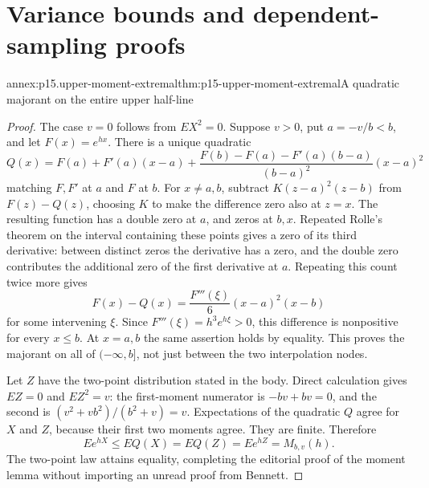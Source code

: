 \section{Variance bounds and dependent-sampling proofs}
\label{sec:annex-p15-variance-dependent-concentration}

\begin{annexitem}{annex:p15.upper-moment-extremal}{thm:p15-upper-moment-extremal}{A quadratic majorant on the entire upper half-line}
\begin{proof}
The case \(v=0\) follows from \(EX^2=0\). Suppose \(v>0\), put
\(a=-v/b<b\), and let \(F(x)=e^{hx}\). There is a unique quadratic
\[
 Q(x)=F(a)+F'(a)(x-a)
 +\frac{F(b)-F(a)-F'(a)(b-a)}{(b-a)^2}(x-a)^2
\]
matching \(F,F'\) at \(a\) and \(F\) at \(b\).
For \(x\ne a,b\), subtract
\(K(z-a)^2(z-b)\) from \(F(z)-Q(z)\), choosing \(K\) to make the
difference zero also at \(z=x\). The resulting function has a double
zero at \(a\), and zeros at \(b,x\).
Repeated Rolle's theorem on the interval containing these points gives
a zero of its third derivative: between distinct zeros the derivative
has a zero, and the double zero contributes the additional zero of the
first derivative at \(a\). Repeating this count twice more gives
\[
 F(x)-Q(x)=\frac{F'''(\xi)}6(x-a)^2(x-b)
\]
for some intervening \(\xi\). Since \(F'''(\xi)=h^3e^{h\xi}>0\),
this difference is nonpositive for every \(x\leq b\).
At \(x=a,b\) the same assertion holds by equality.
This proves the majorant on all of \((-\infty,b]\), not just between
the two interpolation nodes.

Let \(Z\) have the two-point distribution stated in the body.
Direct calculation gives \(EZ=0\) and \(EZ^2=v\):
the first-moment numerator is \(-bv+bv=0\), and the second is
\((v^2+vb^2)/(b^2+v)=v\).
Expectations of the quadratic \(Q\) agree for \(X\) and \(Z\), because
their first two moments agree. They are finite.
Therefore
\[
 Ee^{hX}\leq EQ(X)=EQ(Z)=Ee^{hZ}=M_{b,v}(h).
\]
The two-point law attains equality, completing the editorial proof
of the moment lemma without importing an unread proof from Bennett.
\end{proof}
\end{annexitem}

